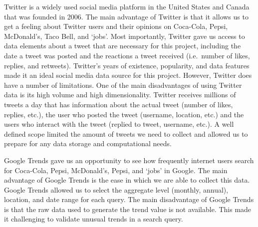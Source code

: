 \documentclass[12pt,oneside]{chicagocapstone}
\begin{document}
Twitter is a widely used social media platform in the United States and Canada that was founded in 2006. The main advantage of Twitter is that it allows us to get a feeling about Twitter users and their opinions on Coca-Cola, Pepsi, McDonald's, Taco Bell, and `jobs'. Most importantly, Twitter gave us access to data elements about a tweet that are necessary for this project, including the date a tweet was posted and the reactions a tweet received (i.e.~number of likes, replies, and retweets). Twitter's years of existence, popularity, and data features made it an ideal social media data source for this project. However, Twitter does have a number of limitations. One of the main disadvantages of using Twitter data is its high volume and high dimensionality. Twitter receives millions of tweets a day that has information about the actual tweet (number of likes, replies, etc.), the user who posted the tweet (username, location, etc.) and the users who interact with the tweet (replied to tweet, username, etc.). A well defined scope limited the amount of tweets we need to collect and allowed us to prepare for any data storage and computational needs.

Google Trends gave us an opportunity to see how frequently internet users search for Coca-Cola, Pepsi, McDonald's, Pepsi, and `jobs' in Google. The main advantage of Google Trends is the ease in which we are able to collect this data. Google Trends allowed us to select the aggregate level (monthly, annual), location, and date range for each query. The main disadvantage of Google Trends is that the raw data used to generate the trend value is not available. This made it challenging to validate unusual trends in a search query.
\end{document}
